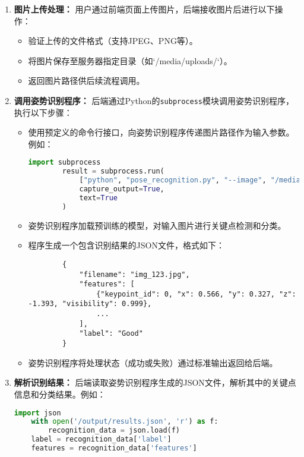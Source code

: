 \begin{enumerate}
    \item \textbf{图片上传处理：}
    用户通过前端页面上传图片，后端接收图片后进行以下操作：
    \begin{itemize}
        \item 验证上传的文件格式（支持JPEG、PNG等）。
        \item 将图片保存至服务器指定目录（如`/media/uploads/`）。
        \item 返回图片路径供后续流程调用。
    \end{itemize}

    \item \textbf{调用姿势识别程序：}
    后端通过Python的\texttt{subprocess}模块调用姿势识别程序，执行以下步骤：
    \begin{itemize}
        \item 使用预定义的命令行接口，向姿势识别程序传递图片路径作为输入参数。例如：
        \begin{lstlisting}[language=Python]
        import subprocess
        result = subprocess.run(
            ["python", "pose_recognition.py", "--image", "/media/uploads/img_123.jpg"],
            capture_output=True,
            text=True
        )
        \end{lstlisting}
        \item 姿势识别程序加载预训练的模型，对输入图片进行关键点检测和分类。
        \item 程序生成一个包含识别结果的JSON文件，格式如下：
        \begin{lstlisting}
        {
            "filename": "img_123.jpg",
            "features": [
                {"keypoint_id": 0, "x": 0.566, "y": 0.327, "z": -1.393, "visibility": 0.999},
                ...
            ],
            "label": "Good"
        }
        \end{lstlisting}
        \item 姿势识别程序将处理状态（成功或失败）通过标准输出返回给后端。
    \end{itemize}

    \item \textbf{解析识别结果：}
    后端读取姿势识别程序生成的JSON文件，解析其中的关键点信息和分类结果。例如：
    \begin{lstlisting}[language=Python]
    import json
    with open('/output/results.json', 'r') as f:
        recognition_data = json.load(f)
    label = recognition_data['label']
    features = recognition_data['features']
    \end{lstlisting}


\end{enumerate}
